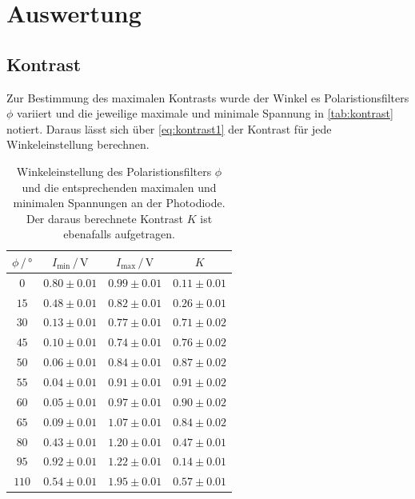 \section{Auswertung}
\label{sec:Auswertung}

\subsection{Kontrast}

Zur Bestimmung des maximalen Kontrasts wurde der Winkel es Polaristionsfilters $\phi$ variiert und die jeweilige maximale und minimale Spannung in \autoref{tab:kontrast} notiert.
Daraus lässt sich über \autoref{eq:kontrast1} der Kontrast für jede Winkeleinstellung berechnen. 
\begin{table}
    \centering
    \caption{Winkeleinstellung des Polaristionsfilters $\phi$ und die entsprechenden maximalen und minimalen Spannungen an der Photodiode. Der daraus berechnete Kontrast $K$ ist ebenafalls aufgetragen.}
    \label{tab:kontrast}
    \begin{tabular}{c c c c}
        \toprule
        $\phi \,/\, \unit{\degree}$ & $I_\text{min} \,/\, \unit{\volt}$ & $I_\text{max} \,/\, \unit{\volt}$ & $K$ \\
        \midrule
        $0  $ &   $ 0.80\pm 0.01$ & $ 	0.99 \pm 0.01$ &  $ 0.11 \pm 0.01 $ \\
        $15	$ &   $ 0.48\pm 0.01$ & $	0.82 \pm 0.01$ &  $ 0.26 \pm 0.01 $ \\
        $30	$ &   $ 0.13\pm 0.01$ & $	0.77 \pm 0.01$ &  $ 0.71 \pm 0.02 $ \\
        $45	$ &   $ 0.10\pm 0.01$ & $	0.74 \pm 0.01$ &  $ 0.76 \pm 0.02 $ \\
        $50	$ &   $ 0.06\pm 0.01$ & $	0.84 \pm 0.01$ &  $ 0.87 \pm 0.02 $ \\
        $55	$ &   $ 0.04\pm 0.01$ & $	0.91 \pm 0.01$ &  $ 0.91 \pm 0.02 $ \\
        $60	$ &   $ 0.05\pm 0.01$ & $	0.97 \pm 0.01$ &  $ 0.90 \pm 0.02 $ \\
        $65	$ &   $ 0.09\pm 0.01$ & $	1.07 \pm 0.01$ &  $ 0.84 \pm 0.02 $ \\
        $80	$ &   $ 0.43\pm 0.01$ & $	1.20 \pm 0.01$ &  $ 0.47 \pm 0.01 $ \\
        $95	$ &   $ 0.92\pm 0.01$ & $	1.22 \pm 0.01$ &  $ 0.14 \pm 0.01 $ \\
        $110$ &   $ 0.54\pm 0.01$ & $  	1.95 \pm 0.01$ &  $ 0.57 \pm 0.01 $ \\

\end{tabular}
\end{table}
